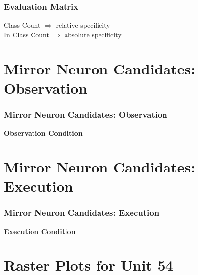 \documentclass{beamer}
\begin{document}
\begin{frame}
\frametitle{Evaluation Matrix}
\begin{center}
Class Count $\Longrightarrow$ relative specificity\\
In Class Count $\Longrightarrow$ absolute specificity


\end{center}
\end{frame}

\section{Mirror Neuron Candidates: Observation}

\begin{frame}
\frametitle{Mirror Neuron Candidates: Observation}
\textbf{Observation Condition}\\
\begin{center}
\end{center}

\end{frame}

\section{Mirror Neuron Candidates: Execution}

\begin{frame}
\frametitle{Mirror Neuron Candidates: Execution}

\textbf{Execution Condition}\\
\begin{center}
\end{center}

\end{frame}


\section{Raster Plots for Unit 54}
\end{document}
